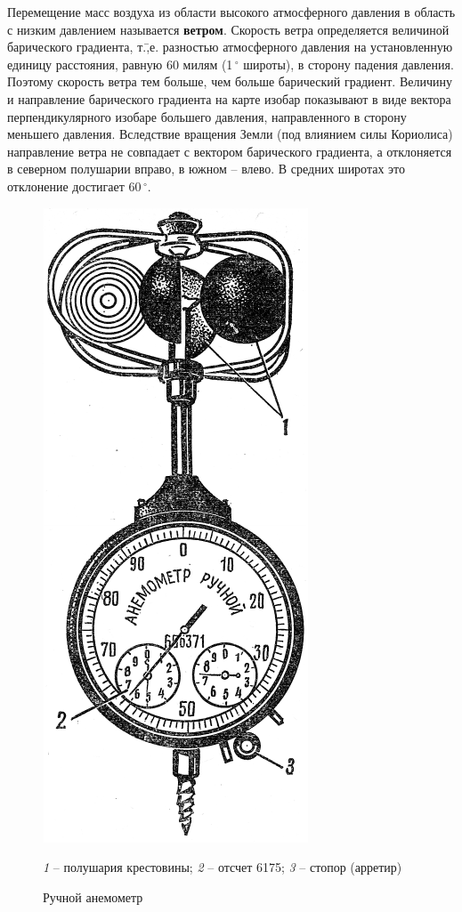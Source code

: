 \documentclass[a4paper, 12pt, twoside, final, book, russian, fittopage, cyremdash]{ncc}
\newcommand{\gr}{\ensuremath{\,^\circ}\xspace}
\begin{document}
Перемещение масс воздуха из области высокого атмосферного давления в область с низким давлением называется \textbf{ветром}. Скорость ветра определяется величиной барического градиента, т.\=,е. разностью атмосферного давления на установленную единицу расстояния, равную 60 милям (1\gr широты), в сторону падения давления. Поэтому скорость ветра тем больше, чем больше барический градиент. Величину и направление барического градиента на карте изобар показывают в виде вектора перпендикулярного изобаре большего давления, направленного в сторону меньшего давления. Вследствие вращения Земли (под влиянием силы Кориолиса) направление ветра не совпадает с вектором барического градиента, а отклоняется в северном полушарии вправо, в южном \--- влево. В средних широтах это отклонение достигает 60\gr.

\begin{figure}[htb]
  \centering{}
  \includegraphics[scale=1.2]{0116P}
  \caption{Ручной анемометр}
  \label{fig:116}
  \small
  \centering{}
  \textit{1} \--- полушария крестовины; \textit{2} \--- отсчет 6175; \textit{3} \--- стопор (арретир)
\end{figure}
\end{document}
